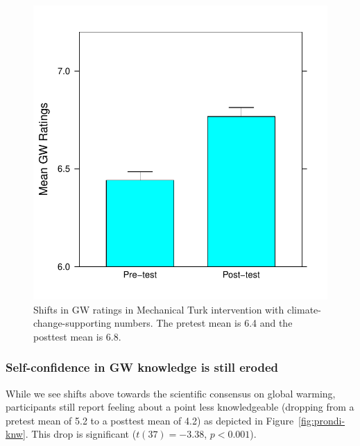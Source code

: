 \begin{figure}
    \centering
    \includegraphics{CCO-prondi-gw.pdf}
    \caption{Shifts in GW ratings in Mechanical Turk intervention with
        climate-change-supporting numbers. The pretest mean is 6.4 and the
        posttest mean is 6.8.}
    \label{fig:prondi-gw}
\end{figure}

\subsubsection{Self-confidence in GW knowledge is still eroded}

While we see shifts above towards the scientific consensus on global warming,
participants still report feeling about a point less knowledgeable (dropping
from a pretest mean of 5.2 to a posttest mean of 4.2) as depicted in
Figure~\ref{fig:prondi-knw}. This drop is significant ($t(37)=-3.38$, $p<0.001$).

